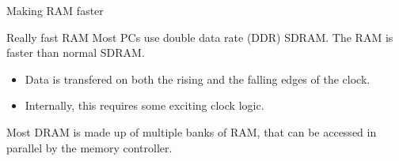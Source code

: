 \begin{frame}{Making RAM faster}
  \begin{block}{Really fast RAM}
    Most PCs use \alert{double data rate} (DDR) SDRAM.  The RAM is faster than normal SDRAM.
  \end{block}
  \begin{itemize}
    \item Data is transfered on both the rising and the falling edges of the clock.
    \item Internally, this requires some exciting clock logic.
  \end{itemize}
  Most DRAM is made up of multiple banks of RAM, that can be accessed in parallel by the memory controller.
\end{frame}


